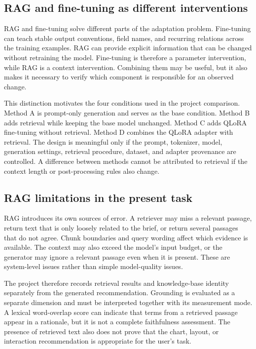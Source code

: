 \subsection{RAG and fine-tuning as different interventions}

RAG and fine-tuning solve different parts of the adaptation problem. Fine-tuning can teach stable output conventions, field names, and recurring relations across the training examples. RAG can provide explicit information that can be changed without retraining the model. Fine-tuning is therefore a parameter intervention, while RAG is a context intervention. Combining them may be useful, but it also makes it necessary to verify which component is responsible for an observed change.

This distinction motivates the four conditions used in the project comparison. Method A is prompt-only generation and serves as the base condition. Method B adds retrieval while keeping the base model unchanged. Method C adds QLoRA fine-tuning without retrieval. Method D combines the QLoRA adapter with retrieval. The design is meaningful only if the prompt, tokenizer, model, generation settings, retrieval procedure, dataset, and adapter provenance are controlled. A difference between methods cannot be attributed to retrieval if the context length or post-processing rules also change.

\subsection{RAG limitations in the present task}

RAG introduces its own sources of error. A retriever may miss a relevant passage, return text that is only loosely related to the brief, or return several passages that do not agree. Chunk boundaries and query wording affect which evidence is available. The context may also exceed the model's input budget, or the generator may ignore a relevant passage even when it is present. These are system-level issues rather than simple model-quality issues.

The project therefore records retrieval results and knowledge-base identity separately from the generated recommendation. Grounding is evaluated as a separate dimension and must be interpreted together with its measurement mode. A lexical word-overlap score can indicate that terms from a retrieved passage appear in a rationale, but it is not a complete faithfulness assessment. The presence of retrieved text also does not prove that the chart, layout, or interaction recommendation is appropriate for the user's task.

